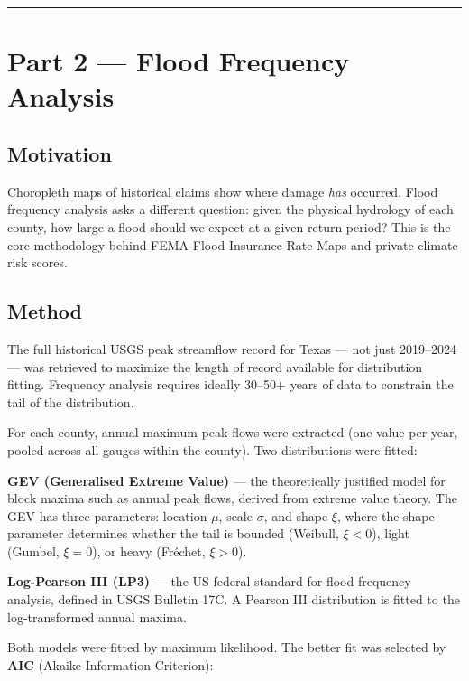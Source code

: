 \documentclass[
  letterpaper,
  DIV=11,
  numbers=noendperiod]{scrartcl}
\begin{document}
\begin{center}\rule{0.5\linewidth}{0.5pt}\end{center}

\section{Part 2 --- Flood Frequency
Analysis}\label{part-2-flood-frequency-analysis}

\subsection{Motivation}\label{motivation}

Choropleth maps of historical claims show where damage \emph{has}
occurred. Flood frequency analysis asks a different question: given the
physical hydrology of each county, how large a flood should we expect at
a given return period? This is the core methodology behind FEMA Flood
Insurance Rate Maps and private climate risk scores.

\subsection{Method}\label{method}

The full historical USGS peak streamflow record for Texas --- not just
2019--2024 --- was retrieved to maximize the length of record available
for distribution fitting. Frequency analysis requires ideally 30--50+
years of data to constrain the tail of the distribution.

For each county, annual maximum peak flows were extracted (one value per
year, pooled across all gauges within the county). Two distributions
were fitted:

\textbf{GEV (Generalised Extreme Value)} --- the theoretically justified
model for block maxima such as annual peak flows, derived from extreme
value theory. The GEV has three parameters: location \(\mu\), scale
\(\sigma\), and shape \(\xi\), where the shape parameter determines
whether the tail is bounded (Weibull, \(\xi < 0\)), light (Gumbel,
\(\xi = 0\)), or heavy (Fréchet, \(\xi > 0\)).

\textbf{Log-Pearson III (LP3)} --- the US federal standard for flood
frequency analysis, defined in USGS Bulletin 17C. A Pearson III
distribution is fitted to the log-transformed annual maxima.

Both models were fitted by maximum likelihood. The better fit was
selected by \textbf{AIC} (Akaike Information Criterion):
\end{document}
